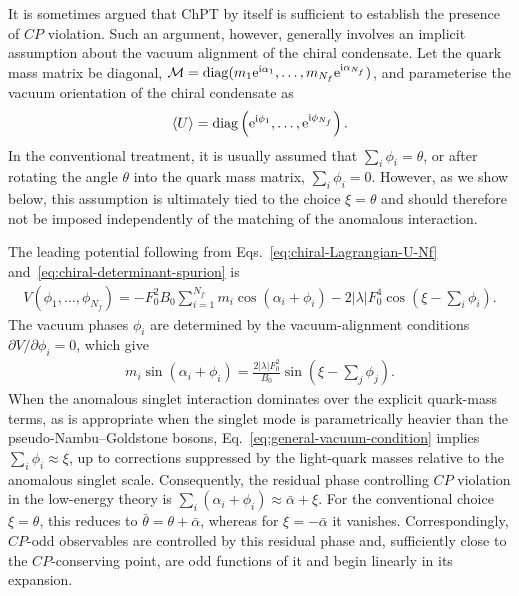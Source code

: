 \documentclass[review]{elsarticle}
\numberwithin{equation}{section}
\numberwithin{table}{section}
\numberwithin{figure}{section}
\def\i{\mathrm{i}}
\def\e{\mathrm{e}}
\def\M{\mathcal{M}}
\begin{document}
It is sometimes argued that ChPT by itself is sufficient to establish the presence of $CP$ violation. Such an argument, however, generally involves an implicit assumption about the vacuum alignment of the chiral condensate. Let the quark mass matrix be diagonal,
$\M={\rm diag}(m_1\e^{\i\alpha_1},\ldots,m_{N_f}\e^{\i\alpha_{N_f}})$,
and parameterise the vacuum orientation of the chiral condensate as
\begin{align}
    \langle U\rangle = {\rm diag} \left( \e^{\i\phi_1}, \ldots, \e^{\i\phi_{N_f}} \right).
\end{align}
In the conventional treatment, it is usually assumed that $\sum_i\phi_i=\theta$, or after rotating the angle $\theta$ into the quark mass matrix, $\sum_i\phi_i=0$. However, as we show below, this assumption is ultimately tied to the choice $\xi=\theta$ and should therefore not be imposed independently of the matching of the anomalous interaction.

The leading potential following from Eqs.~\eqref{eq:chiral-Lagrangian-U-Nf} and~\eqref{eq:chiral-determinant-spurion} is
\begin{align}
    V(\phi_1,\ldots,\phi_{N_f}) = -F_0^2B_0 \sum_{i=1}^{N_f} m_i\cos(\alpha_i+\phi_i) - 2|\lambda|F_0^4 \cos\left(\xi-\sum_i\phi_i \right).
    \label{eq:general-chiral-potential}
\end{align}
The vacuum phases $\phi_i$ are determined by the vacuum-alignment conditions $\partial V/\partial\phi_i=0$, which give
\begin{align}
    m_i\sin(\alpha_i+\phi_i) = \frac{2|\lambda|F_0^2}{B_0} \sin\left(\xi-\sum_j\phi_j \right).
    \label{eq:general-vacuum-condition}
\end{align}
When the anomalous singlet interaction dominates over the explicit quark-mass terms, as is appropriate when the singlet mode is parametrically heavier than the pseudo-Nambu--Goldstone bosons, Eq.~\eqref{eq:general-vacuum-condition} implies $\sum_i\phi_i\approx\xi$, up to corrections suppressed by the light-quark masses relative to the anomalous singlet scale. Consequently, the residual phase controlling $CP$ violation in the low-energy theory is $\sum_i(\alpha_i+\phi_i)\approx\bar\alpha+\xi$. For the conventional choice $\xi=\theta$, this reduces to $\bar\theta=\theta+\bar\alpha$, whereas for $\xi=-\bar\alpha$ it vanishes. Correspondingly, $CP$-odd observables are controlled by this residual phase and, sufficiently close to the $CP$-conserving point, are odd functions of it and begin linearly in its expansion.
\end{document}
